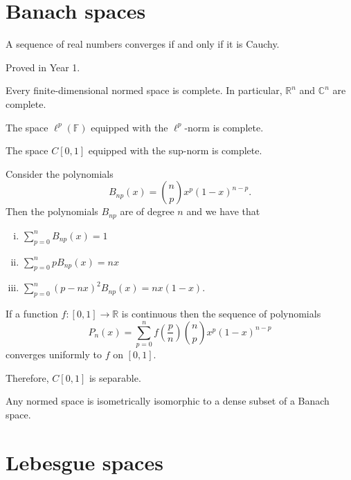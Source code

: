 \documentclass[a4paper]{article}
\newcommand{\F}{\mathbb{F}}
\newcommand{\R}{\mathbb{R}}
\newcommand{\C}{\mathbb{C}}
\newcommand{\<}{\langle}
\renewcommand{\>}{\rangle}
\begin{document}
\section{Banach spaces}

\begin{thm}
  A sequence of real numbers converges if and only if it is Cauchy.
\end{thm}
Proved in Year 1.

\begin{thm}
  Every finite-dimensional normed space is complete. In particular, $\R^n$ and $\C^n$ are complete.
\end{thm}

\begin{thm}
  The space $\ell^p(\F)$ equipped with the $\ell^p$-norm is complete.
\end{thm}

\begin{thm}
  The space $C[0,1]$ equipped with the sup-norm is complete.
\end{thm}

\begin{thm}
  Consider the polynomials
  $$B_{np}(x) = \binom{n}{p}x^p(1-x)^{n-p}.$$
  Then the polynomials $B_{np}$ are of degree $n$ and we have that
  \begin{enumerate}[(i)]
    \item $\sum_{p=0}^n B_{np}(x) = 1$\\
    \item $\sum_{p=0}^n pB_{np}(x) = nx$\\
    \item $\sum_{p=0}^n (p-nx)^2B_{np}(x) = nx(1-x)$.
  \end{enumerate}
\end{thm}

\begin{thm}
  If a function $f:[0,1]\to\R$ is continuous then the sequence of polynomials
$$P_n(x) = \sum_{p=0}^n f\left(\frac{p}{n}\right)\binom{n}{p}x^p(1-x)^{n-p}$$
  converges uniformly to $f$ on $[0,1]$.
\end{thm}

Therefore, $C[0,1]$ is separable.%

\begin{thm}
  Any normed space is isometrically isomorphic to a dense subset of a Banach space.
\end{thm}

\section{Lebesgue spaces}
\end{document}
